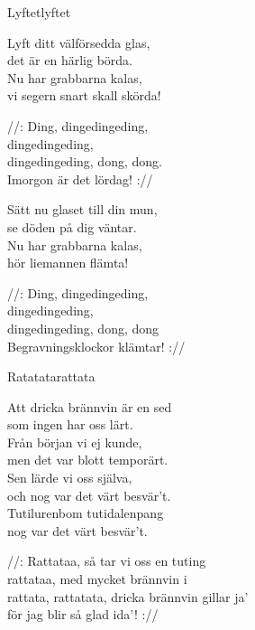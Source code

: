 \begin{song}{Lyftet}{lyftet}
\begin{vers}
Lyft ditt välförsedda glas,\\
det är en härlig börda.\\
Nu har grabbarna kalas,\\
vi segern snart skall skörda!\\
\end{vers}
\begin{vers}
//: Ding, dingedingeding,\\
dingedingeding,\\
dingedingeding, dong, dong.\\
Imorgon är det lördag! ://\\
\end{vers}
\begin{vers}
Sätt nu glaset till din mun,\\
se döden på dig väntar.\\
Nu har grabbarna kalas,\\
hör liemannen flämta!\\
\end{vers}
\begin{vers}
//: Ding, dingedingeding,\\
dingedingeding,\\
dingedingeding, dong, dong\\
Begravningsklockor klämtar! ://\\
\end{vers}
\end{song}

\newpage

\begin{song}{Ratatata}{rattata}
\begin{vers}
Att dricka brännvin är en sed\\
som ingen har oss lärt.\\
Från början vi ej kunde,\\
men det var blott temporärt.\\
Sen lärde vi oss själva,\\
och nog var det värt besvär't.\\
Tutilurenbom tutidalenpang\\
nog var det värt besvär't.\\
\end{vers}
\begin{vers}
//: Rattataa, så tar vi oss en tuting\\
rattataa, med mycket brännvin i\\
rattata, rattatata, dricka brännvin gillar ja'\\
för jag blir så glad ida'! ://\\
\end{vers}
\end{song}

